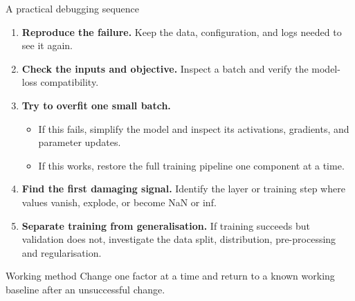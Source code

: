 \begin{frame}{A practical debugging sequence}
\begin{enumerate}
  \item \textbf{Reproduce the failure.} Keep the data, configuration, and logs needed to see it again.
  \item \textbf{Check the inputs and objective.} Inspect a batch and verify the model-loss compatibility.
  \item \textbf{Try to overfit one small batch.}
  \begin{itemize}
    \item If this fails, simplify the model and inspect its activations, gradients, and parameter updates.
    \item If this works, restore the full training pipeline one component at a time.
  \end{itemize}
  \item \textbf{Find the first damaging signal.} Identify the layer or training step where values vanish, explode, or become NaN or inf.
  \item \textbf{Separate training from generalisation.} If training succeeds but validation does not, investigate the data split, distribution, pre-processing and regularisation.
\end{enumerate}

\begin{block}{Working method}
Change one factor at a time and return to a known working baseline after an unsuccessful change.
\end{block}
\end{frame}


